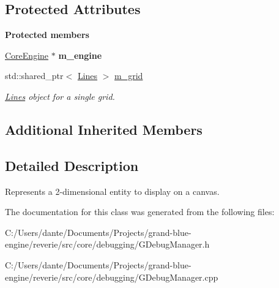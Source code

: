 \subsection*{Protected Attributes}
\begin{Indent}\textbf{ Protected members}\par
\begin{DoxyCompactItemize}
\item 
\mbox{\label{classrev_1_1_debug_grid_afad9ad4446335f4e839f3e4776887b89}} 
\mbox{\hyperlink{classrev_1_1_core_engine}{Core\+Engine}} $\ast$ {\bfseries m\+\_\+engine}
\item 
\mbox{\label{classrev_1_1_debug_grid_acf0e16a60e97ece56ec2d3202e294057}} 
std\+::shared\+\_\+ptr$<$ \mbox{\hyperlink{classrev_1_1_lines}{Lines}} $>$ \mbox{\hyperlink{classrev_1_1_debug_grid_acf0e16a60e97ece56ec2d3202e294057}{m\+\_\+grid}}
\begin{DoxyCompactList}\small\item\em \mbox{\hyperlink{classrev_1_1_lines}{Lines}} object for a single grid. \end{DoxyCompactList}\end{DoxyCompactItemize}
\end{Indent}
\subsection*{Additional Inherited Members}


\subsection{Detailed Description}
Represents a 2-\/dimensional entity to display on a canvas. 

The documentation for this class was generated from the following files\+:\begin{DoxyCompactItemize}
\item 
C\+:/\+Users/dante/\+Documents/\+Projects/grand-\/blue-\/engine/reverie/src/core/debugging/G\+Debug\+Manager.\+h\item 
C\+:/\+Users/dante/\+Documents/\+Projects/grand-\/blue-\/engine/reverie/src/core/debugging/G\+Debug\+Manager.\+cpp\end{DoxyCompactItemize}

